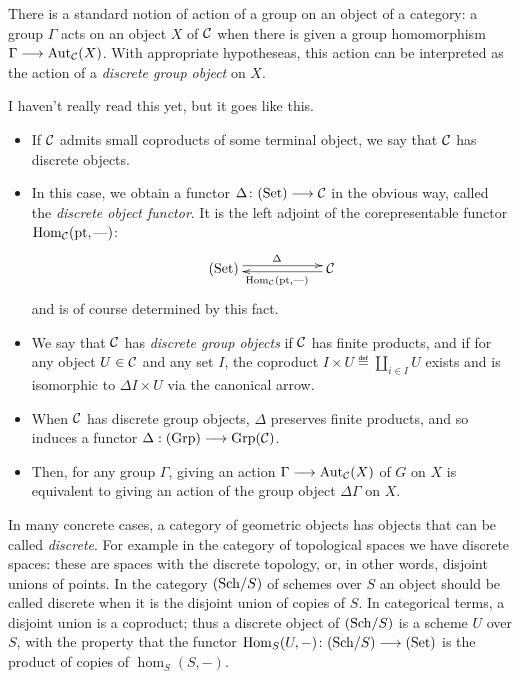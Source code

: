 \begin{2   CONTRAVARIANT FUNCTORS}
\begin{2.2 Group objects}
There is a standard notion of action of a group on an object of a category: a group $\Gamma$ acts on an object $X$ of $\mathcal{C}$ when there is given a group homomorphism $\Gamma \arr \aut_{\cC}(X)$. With appropriate hypotheseas, this action can be interpreted as the action of a \emph{discrete group object} on $X$.
\begin{shaded}
I haven't really read this yet, but it goes like this.
\begin{itemize}\squishlist
\item If $\mathcal{C}$ admits small coproducts of some terminal object, we say that $\mathcal{C}$ has discrete objects.
\item In this case, we obtain a functor $\Delta \colon \catset \arr
\cC$ in the obvious way, called the \emph{discrete object functor}. It is the left adjoint of the corepresentable functor $\operatorname{Hom}_{\mathcal{C}}(\mathrm{pt},\textup{---})$:
\[\xymatrix@R=.3cm@C=2cm{
\catset  \ar@<.6ex>[r]^{\Delta}&
\calC  \ar@<.4ex>[l]^{\hom_\calC(\pt,\DASH)}\\
}\]
and is of course determined by this fact.
\item We say that $\mathcal{C}$ has \emph{discrete group objects} if $\mathcal{C}$ has finite products, and if
for any object $U\in\mathcal{C}$ and any set $I$, the coproduct $I \times U \eqdef \coprod_{i \in I} U$ exists and is isomorphic to $\Delta I\times U$ via the canonical arrow.
\item When $\mathcal{C}$ has discrete group objects, $\Delta$ preserves finite products, and so induces a functor $\Delta:(\mathrm{Grp})\longrightarrow\mathrm{Grp}(\mathcal{C})$.
\item Then, for any group $\Gamma$, giving an action $\Gamma\arr \aut_{\cC}(X)$ of $G$ on $X$ is equivalent to giving an action of the group object $\Delta\Gamma$ on $X$.
\end{itemize}
\end{shaded}


In many concrete cases, a category of geometric objects has objects that can be called \emph{discrete}. For example in the category of topological spaces we have discrete spaces: these are spaces with the discrete topology, or, in other words, disjoint unions of points. In the category $({\mathrm{Sch}/S})$ of schemes over $S$ an object should be called discrete when it is the disjoint union of copies of $S$. In categorical terms, a disjoint union is a coproduct; thus a discrete object of $({\mathrm{Sch}/S})$ is a scheme $U$ over $S$, with the property that the functor $\hom_S(U, -) \colon \catsch{S} \arr \catset$ is the product of copies of $\hom_S(S, -)$.


\end{2.2 Group objects}
\end{2   CONTRAVARIANT FUNCTORS}
